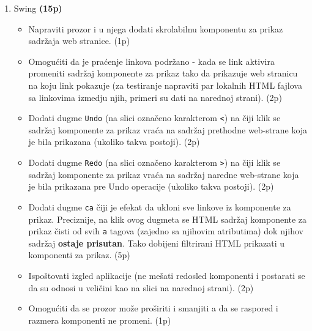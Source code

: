 \documentclass[]{article}
\begin{document}
\begin{enumerate}
  \item Swing \textbf{(15p)}
  \begin{itemize}
    \item Napraviti prozor i u njega dodati skrolabilnu komponentu za prikaz sadr\v{z}aja web stranice. \hfill (1p)
    \item Omogu\'c{}iti da je pra\'c{}enje linkova podr\v{z}ano - kada se link aktivira promeniti sadr\v{z}aj komponente za prikaz tako da prikazuje web stranicu na koju link pokazuje (za testiranje napraviti par lokalnih HTML fajlova sa linkovima izmedju njih, primeri su dati na narednoj strani). \hfill (2p)
    \item Dodati dugme \texttt{Undo} (na slici ozna\v{c}eno karakterom \texttt{<}) na \v{c}iji klik se sadr\v{z}aj komponente za prikaz vra\'c{}a na sadr\v{z}aj prethodne web-strane koja je bila prikazana (ukoliko takva postoji). \hfill (2p)
    \item Dodati dugme \texttt{Redo} (na slici ozna\v{c}eno karakterom \texttt{>}) na \v{c}iji klik se sadr\v{z}aj komponente za prikaz vra\'c{}a na sadr\v{z}aj naredne web-strane koja je bila prikazana pre Undo operacije (ukoliko takva postoji). \hfill (2p)
    \item Dodati dugme \texttt{ca} \v{c}iji je efekat da ukloni sve linkove iz komponente za prikaz. Preciznije, na klik ovog dugmeta se HTML sadr\v{z}aj komponente za prikaz \v{c}isti od svih \texttt{a} tagova (zajedno sa njihovim atributima) dok njihov sadr\v{z}aj \textbf{ostaje prisutan}. Tako dobijeni filtrirani HTML prikazati u komponenti za prikaz. \hfill (5p)
    \item Ispo\v{s}tovati izgled aplikacije (ne me\v{s}ati redosled komponenti i postarati se da su odnosi u veli\v{c}ini kao na slici na narednoj strani). \hfill (2p)
    \item Omogu\'c{}iti da se prozor mo\v{z}e pro\v{s}iriti i smanjiti a da se raspored i razmera komponenti ne promeni. \hfill (1p)
  \end{itemize}

\end{enumerate}


\newpage
\end{document}
